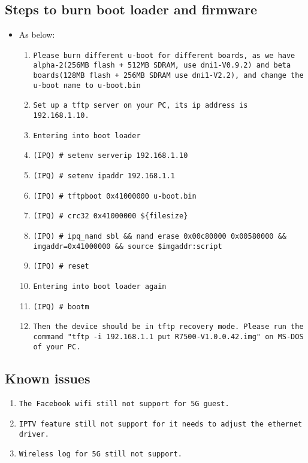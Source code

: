 \documentclass[12pt]{report}
\begin{document}
    \subsection{Steps to burn boot loader and firmware}
    \begin{itemize}
    \item As below:
            \begin{enumerate}
	    	\item \texttt{Please burn different u-boot for different boards, as we have alpha-2(256MB flash + 512MB SDRAM, use dni1-V0.9.2) and beta boards(128MB flash + 256MB SDRAM use dni1-V2.2), and change the u-boot name to u-boot.bin}
		\item \texttt{Set up a tftp server on your PC, its ip address is 192.168.1.10.}
		\item \texttt{Entering into boot loader}
		\item \texttt{(IPQ) \# setenv serverip 192.168.1.10}
		\item \texttt{(IPQ) \# setenv ipaddr 192.168.1.1}
		\item \texttt{(IPQ) \# tftpboot 0x41000000 u-boot.bin}
		\item \texttt{(IPQ) \# crc32 0x41000000 \$\{filesize\}}
		\item \texttt{(IPQ) \# ipq\_nand sbl \&\& nand erase 0x00c80000 0x00580000 \&\& imgaddr=0x41000000 \&\& source \$imgaddr:script}
		\item \texttt{(IPQ) \# reset}
		\item \texttt{Entering into boot loader again}
		\item \texttt{(IPQ) \# bootm}
		\item \texttt{Then the device should be in tftp recovery mode. Please run the command "tftp -i 192.168.1.1 put R7500-V1.0.0.42.img" on MS-DOS of your PC.}
            \end{enumerate}
    \end{itemize}

\subsection{Known issues}
            \begin{enumerate}
		\item \texttt{The Facebook wifi still not support for 5G guest.}
		\item \texttt{IPTV feature still not support for it needs to adjust the ethernet driver.}
		\item \texttt{Wireless log for 5G still not support.}
            \end{enumerate}
\end{document}
